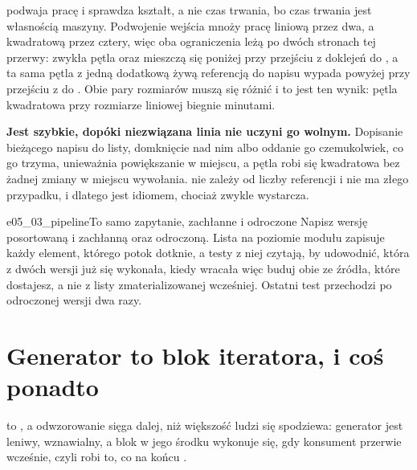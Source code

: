  podwaja pracę i sprawdza kształt, a nie
czas trwania, bo czas trwania jest własnością maszyny. Podwojenie wejścia
mnoży pracę liniową przez dwa, a kwadratową przez cztery, więc oba
ograniczenia leżą po dwóch stronach tej przerwy: zwykła pętla oraz
 mieszczą się poniżej  przy
przejściu z  doklejeń do , a
ta sama pętla z jedną dodatkową żywą referencją do napisu wypada powyżej
 przy przejściu z  do
. Obie pary rozmiarów muszą się różnić i to jest ten
wynik: pętla kwadratowa przy rozmiarze liniowej biegnie minutami.

\begin{trapbox}
\textbf{Jest szybkie, dopóki niezwiązana linia nie uczyni go wolnym.}
Dopisanie bieżącego napisu do listy, domknięcie nad nim albo oddanie go
czemukolwiek, co go trzyma, unieważnia powiększanie w miejscu, a pętla robi
się kwadratowa bez żadnej zmiany w miejscu wywołania.
 nie zależy od liczby referencji i nie ma złego
przypadku, i dlatego jest idiomem, chociaż \code{+=} zwykle wystarcza.
\end{trapbox}

\begin{exercise}{e05_03_pipeline}{To samo zapytanie, zachłanne i odroczone}
Napisz wersję posortowaną i zachłanną oraz odroczoną. Lista na poziomie
modułu zapisuje każdy element, którego potok dotknie, a testy z niej czytają,
by udowodnić, która z dwóch wersji już się wykonała, kiedy wracała \dash{}
więc buduj obie ze źródła, które dostajesz, a nie z listy zmaterializowanej
wcześniej. Ostatni test przechodzi po odroczonej wersji dwa razy.
\end{exercise}

\section{Generator to blok iteratora, i coś ponadto}
\label{sec:ch05-generators}

 to , a odwzorowanie sięga dalej, niż
większość ludzi się spodziewa: generator jest leniwy, wznawialny, a blok
 w jego środku wykonuje się, gdy konsument przerwie wcześnie,
czyli robi to, co  na końcu .


